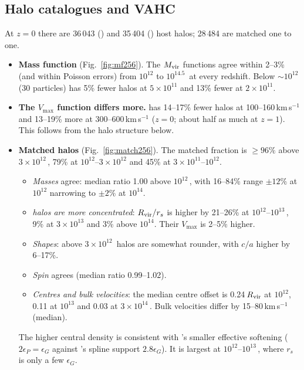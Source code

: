 \subsection{Halo catalogues and VAHC}

At $z=0$ there are 36\,043 (\gad{}) and 35\,404 (\pkd{}) host halos; 28\,484 are matched one to one.
\begin{itemize}
\item \textbf{Mass function} (Fig.~\ref{fig:mf256}). The $M_{\rm vir}$ functions agree within 2--3\% (and within
Poisson errors) from $10^{12}$ to $10^{14.5}$\,\Msunh{} at every redshift. Below $\sim 10^{12}$\,\Msunh{} (30
particles) \pkd{} has 5\% fewer halos at $5\times10^{11}$ and 13\% fewer at $2\times10^{11}$.
\item \textbf{The $V_{\max}$ function differs more.} \pkd{} has 14--17\% fewer halos at 100--160\,km\,s$^{-1}$ and
13--19\% more at 300--600\,km\,s$^{-1}$ ($z=0$; about half as much at $z=1$). This follows from the halo structure
below.
\item \textbf{Matched halos} (Fig.~\ref{fig:match256}). The matched fraction is $\ge 96\%$ above
$3\times10^{12}$\,\Msunh{}, 79\% at $10^{12}$--$3\times10^{12}$ and 45\% at
$3\times10^{11}$--$10^{12}$.
  \begin{itemize}
  \item \emph{Masses} agree: median ratio 1.00 above $10^{12}$\,\Msunh{}, with 16--84\% range $\pm12\%$ at $10^{12}$
  narrowing to $\pm2\%$ at $10^{14}$.
  \item \emph{\pkd{} halos are more concentrated}: $R_{\rm vir}/r_s$ is higher by 21--26\% at
  $10^{12}$--$10^{13}$\,\Msunh{}, 9\% at $3\times10^{13}$ and 3\% above $10^{14}$. Their $V_{\max}$ is 2--5\% higher.
  \item \emph{Shapes}: above $3\times10^{12}$\,\Msunh{} \pkd{} halos are somewhat rounder, with $c/a$ higher by 6--17\%.
  \item \emph{Spin} agrees (median ratio 0.99--1.02).
  \item \emph{Centres and bulk velocities}: the median centre offset is 0.24\,$R_{\rm vir}$ at $10^{12}$, 0.11 at
  $10^{13}$ and 0.03 at $3\times10^{14}$\,\Msunh{}. Bulk velocities differ by 15--80\,km\,s$^{-1}$ (median).
  \end{itemize}
  The higher central density is consistent with \pkd{}'s smaller effective softening ($2\epsilon_P = \epsilon_G$
  against \gad{}'s spline support $2.8\epsilon_G$). It is largest at $10^{12}$--$10^{13}$\,\Msunh{}, where
  $r_s$ is only a few $\epsilon_G$.

\end{itemize}
